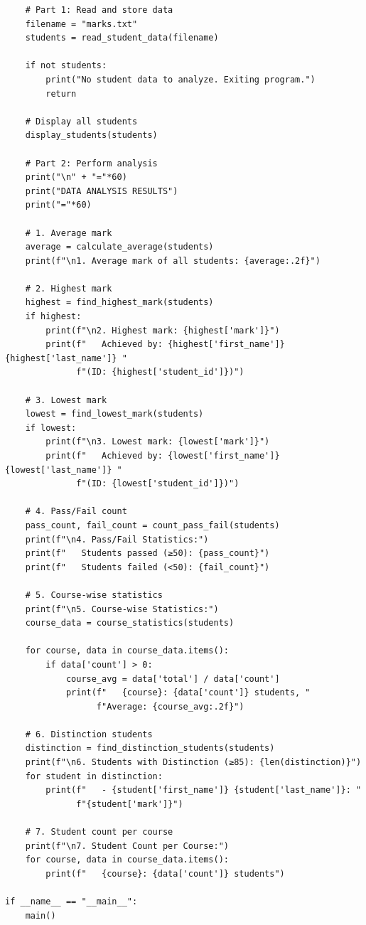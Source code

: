 \documentclass[a4paper,11pt]{article}
\theoremstyle{mytheor}
\begin{document}
\begin{lstlisting}
    # Part 1: Read and store data
    filename = "marks.txt"
    students = read_student_data(filename)
    
    if not students:
        print("No student data to analyze. Exiting program.")
        return
    
    # Display all students
    display_students(students)
    
    # Part 2: Perform analysis
    print("\n" + "="*60)
    print("DATA ANALYSIS RESULTS")
    print("="*60)
    
    # 1. Average mark
    average = calculate_average(students)
    print(f"\n1. Average mark of all students: {average:.2f}")
    
    # 2. Highest mark
    highest = find_highest_mark(students)
    if highest:
        print(f"\n2. Highest mark: {highest['mark']}")
        print(f"   Achieved by: {highest['first_name']} {highest['last_name']} "
              f"(ID: {highest['student_id']})")
    
    # 3. Lowest mark
    lowest = find_lowest_mark(students)
    if lowest:
        print(f"\n3. Lowest mark: {lowest['mark']}")
        print(f"   Achieved by: {lowest['first_name']} {lowest['last_name']} "
              f"(ID: {lowest['student_id']})")
    
    # 4. Pass/Fail count
    pass_count, fail_count = count_pass_fail(students)
    print(f"\n4. Pass/Fail Statistics:")
    print(f"   Students passed (≥50): {pass_count}")
    print(f"   Students failed (<50): {fail_count}")
    
    # 5. Course-wise statistics
    print(f"\n5. Course-wise Statistics:")
    course_data = course_statistics(students)
    
    for course, data in course_data.items():
        if data['count'] > 0:
            course_avg = data['total'] / data['count']
            print(f"   {course}: {data['count']} students, "
                  f"Average: {course_avg:.2f}")
    
    # 6. Distinction students
    distinction = find_distinction_students(students)
    print(f"\n6. Students with Distinction (≥85): {len(distinction)}")
    for student in distinction:
        print(f"   - {student['first_name']} {student['last_name']}: "
              f"{student['mark']}")
    
    # 7. Student count per course
    print(f"\n7. Student Count per Course:")
    for course, data in course_data.items():
        print(f"   {course}: {data['count']} students")

if __name__ == "__main__":
    main()
\end{lstlisting}
\end{document}
